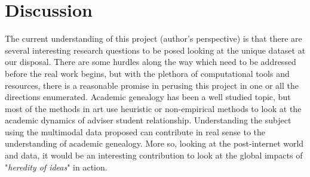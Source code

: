 \documentclass[a4paper]{article}
\begin{document}
\section{Discussion}
The current understanding of this project (author's perspective) is that there are several interesting research questions to be posed looking at the unique dataset at our disposal. There are some hurdles along the way which need to be addressed before the real work begins, but with the plethora of computational tools and resources, there is a reasonable promise in perusing this project in one or all the directions enumerated. Academic genealogy has been a well studied topic, but most of the methods in art use heuristic or non-empirical methods to look at the academic dynamics of adviser student relationship. Understanding the subject using the multimodal data proposed can contribute in real sense to the understanding of academic genealogy. More so, looking at the post-internet world and data, it would be an interesting contribution to look at the global impacts of "\textit{heredity of ideas}" in action.




\end{document}

